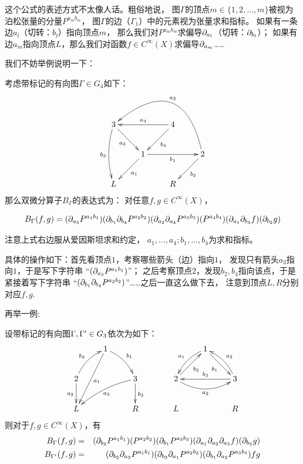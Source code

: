 这个公式的表述方式不太像人话。粗俗地说，
图$\Gamma$的顶点$m\in\{1,2,...,m\}$被视为泊松张量的分量$P^{a_mb_m}$，
图$\Gamma$的边（$\Gamma_1$）中的元素视为张量求和指标。
如果有一条边$a_l$（切转：$b_l$）指向顶点$m$，
那么我们对$P^{a_mb_m}$求偏导$\partial_{a_l}$（切转：$\partial_{b_l}$）；
如果有边$a_m$指向顶点$L$，那么我们对函数$f\in C^{\infty}(X)$求偏导$\partial_{a_m}$……

我们不妨举例说明一下：

\begin{example}考虑带标记的有向图$\Gamma\in G_4$如下：
$$
  \xymatrix{
     3 \ar[rd]_{a_3}  \ar@/_/[dd]_{b_3}
    &
    &4 \ar[ll]_{a_4}  \ar[ld]^{b_4}
    &
  \\
    &1 \ar[ld]^{a_1}  \ar[rr]_{b_1}
    &
    &2 \ar@/_4pc/[ulll]_{a_2}  \ar[ld]^{b_2}
  \\
     L
    &
    &R
    &
  }
$$
那么双微分算子$B_{\Gamma}$的表达式为：
对任意$f,g\in C^{\infty}(X)$，

$$
  B_{\Gamma}(f,g)
=
  (\partial_{a_3}P^{a_1b_1})
  (\partial_{{b_1}}\partial_{b_4}{P^{a_2b_2}})
  (\partial_{a_2}\partial_{a_4}{P^{a_3b_3}})
  (P^{a_4b_4})
  (\partial_{{a_1}}\partial_{b_3}{f})
  (\partial_{b_2}{g})
$$

注意上式右边服从爱因斯坦求和约定，
$a_1,...,a_4;b_1,...,b_4$为求和指标。
\end{example}

具体的操作如下：首先看顶点$1$，考察哪些箭头（边）指向$1$，
发现只有箭头$a_3$指向$1$，于是写下字符串
“$(\partial_{a_3}P^{a_1b_1})$”；
之后考察顶点$2$，发现$b_2,b_4$指向该点，于是紧接着写下字符串
“$(\partial_{{b_1}}\partial_{b_4}{P^{a_2b_2}})$”……之后一直这么做下去，
注意到顶点$L,R$分别对应$f,g$.

再举一例:
\begin{example}设带标记的有向图$\Gamma,\Gamma'\in G_3$依次为如下：
$$
  \xymatrix{
     & 1 \ar[ddl]^{a_1}      \ar@/^/[dr]^{b_1}
     &
   \\
       2 \ar@/^/[ur]^{b_2}   \ar[d]_{a_2}
     &
     & 3 \ar@/_/[lld]^{a_3}  \ar[d]^{b_3}
   \\
       L
     &
     & R
  }
\quad\qquad
  \xymatrix{
     & 1 \ar@/_/[dl]_{a_1}      \ar[dr]_{b_1}
     &
   \\
       2 \ar[ur]_{b_2}          \ar@/_1pc/[rr]_{a_2}
     &
     & 3 \ar@/_/[lu]_{a_3}      \ar[ll]_{b_3}
   \\
       L
     &
     & R
  }
$$
则对于$f,g\in C^{\infty}(X)$，有
\begin{eqnarray*}
     B_\Gamma(f,g)
&=&
     (\partial_{b_2}P^{a_1b_1})
     (P^{a_2b_2})
     (\partial_{b_1}P^{a_3b_3})
     (\partial_{a_1}\partial_{a_2}\partial_{a_3}f)
     (\partial_{b_3}g)
\\
     B_{\Gamma'}(f,g)
&=&
     (\partial_{b_2}\partial_{a_3}P^{a_1b_1})
     (\partial_{b_3}\partial_{a_1}P^{a_2b_2})
     (\partial_{b_1}\partial_{a_2}P^{a_3b_3})
     fg
\end{eqnarray*}
\end{example}

